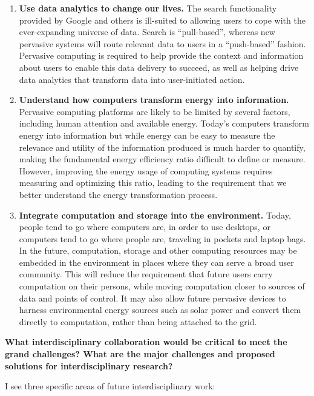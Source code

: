 \begin{flushenumbf}
\begin{enumerate}
\item \textbf{Use data analytics to change our lives.} The search
functionality provided by Google and others is ill-suited to allowing users
to cope with the ever-expanding universe of data. Search is ``pull-based'',
whereas new pervasive systems will route relevant data to users in a
``push-based'' fashion. Pervasive computing is required to help provide the
context and information about users to enable this data delivery to succeed,
as well as helping drive data analytics that transform data into
user-initiated action.

\item \textbf{Understand how computers transform energy into information.}
Pervasive computing platforms are likely to be limited by several factors,
including human attention and available energy. Today's computers transform
energy into information but while energy can be easy to measure the relevance
and utility of the information produced is much harder to quantify, making
the fundamental energy efficiency ratio difficult to define or measure.
However, improving the energy usage of computing systems requires measuring
and optimizing this ratio, leading to the requirement that we better
understand the energy transformation process.

\item \textbf{Integrate computation and storage into the environment.} Today,
people tend to go where computers are, in order to use desktops, or computers
tend to go where people are, traveling in pockets and laptop bags. In the
future, computation, storage and other computing resources may be embedded in
the environment in places where they can serve a broad user community. This
will reduce the requirement that future users carry computation on their
persons, while moving computation closer to sources of data and points of
control. It may also allow future pervasive devices to harness environmental
energy sources such as solar power and convert them directly to computation,
rather than being attached to the grid.

\end{enumerate}

\item \textbf{What interdisciplinary collaboration would be critical to meet
the grand challenges? What are the major challenges and proposed solutions
for interdisciplinary research?}

I see three specific areas of future interdisciplinary work:


\end{flushenumbf}
